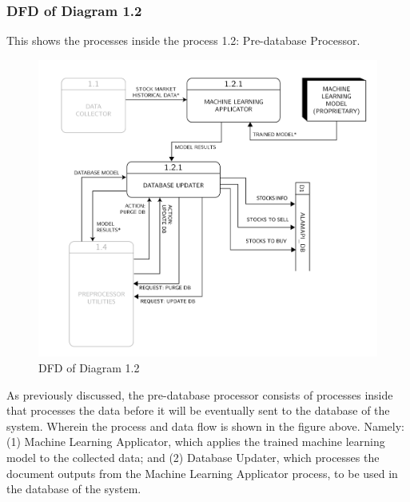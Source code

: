 \subsubsection{DFD of Diagram 1.2}
\label{subsubsec: dfd1.2}
This shows the processes inside the process 1.2: 
Pre-database Processor.
\begin{figure}[ht]
    \centering
    \includegraphics[width=1\textwidth]{./assets/Data Flow Diagram-05.png}
    \caption{DFD of Diagram 1.2}
    \label{fig:dfd1.2}
\end{figure}
\FloatBarrier

As previously discussed, the pre-database processor consists of processes 
inside that processes the data before it will be eventually sent to the database 
of the system. Wherein the process and data flow is shown in the figure above. 
Namely: (1) Machine Learning Applicator, which applies the trained machine learning 
model to the collected data; and 
(2) Database Updater, which processes the document outputs from the Machine 
Learning Applicator process, to be used in the database of the system.



